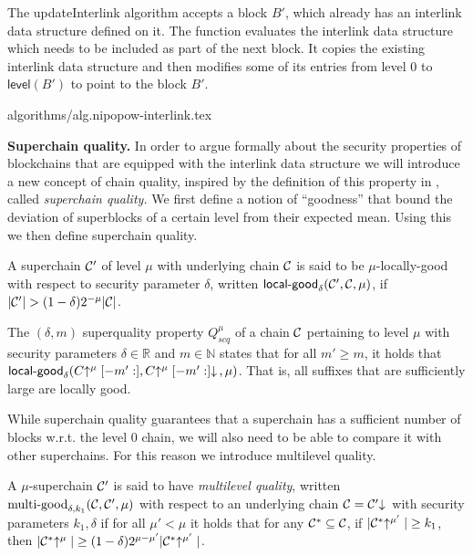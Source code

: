 The updateInterlink algorithm accepts a block $B'$, which already has an
interlink data structure defined on it. The function evaluates the
interlink data structure which needs to be included as part of the next block.
It copies the existing interlink data structure and
then modifies some of its entries from level $0$ to $\textsf{level}(B')$ to
point to the block $B'$.

{algorithms/alg.nipopow-interlink.tex}

\noindent
{\bf Superchain quality.} In order to argue formally about the security
properties of blockchains that are equipped with the interlink
data structure we will introduce a new concept of chain quality,
inspired by the definition of this property in \cite{backbone},
called {\em superchain quality.}
We first define a notion of ``goodness'' that bound the deviation
of superblocks of a certain level from their expected mean. Using
this we then define superchain quality.

\begin{definition}
A superchain $\mathcal{C}'$ of level
$\mu$ with underlying chain $\mathcal{C}$ is said to be $\mu$-\textnormal{locally-good}
with respect to security parameter $\delta$, written
$\textsf{local-good}_{\delta}(\mathcal{C}', \mathcal{C}, \mu)$, if $|\mathcal{C}'| > (1 -
\delta)2^{-\mu}|\mathcal{C}|$.
\end{definition}

\begin{definition}
The $(\delta, m)$ superquality property
$Q^\mu_{scq}$ of a chain $\mathcal{C}$ pertaining to level $\mu$ with security
parameters $\delta \in \mathbb{R}$ and $m \in \mathbb{N}$ states that for all
$m' \geq m$, it holds that $\textsf{local-good}_{\delta}(C\negthickspace\uparrow^\mu[-m':],
C\negthickspace\uparrow^\mu[-m':]\negthickspace\downarrow\,, \mu)$. That is, all suffixes that are
sufficiently large are locally good.
\end{definition}

While superchain quality guarantees that a superchain has a sufficient number
of blocks w.r.t. the level 0 chain, we will also need to be able to compare 
it with other superchains. For this reason we introduce multilevel quality. 

\begin{definition}
A $\mu$-superchain $\mathcal{C}'$ is said to have \textit{multilevel quality}, written
$\textnormal{multi-good}_{\delta, k_1}(\mathcal{C}, \mathcal{C}', \mu)$ with respect to an
underlying chain $\mathcal{C} = \mathcal{C}'\negthickspace\downarrow\,$ with security parameters $k_1,
\delta$ if for all $\mu' < \mu$ it holds that for any $\mathcal{C}^* \subseteq \mathcal{C}$,
if $|\mathcal{C}^*\negthickspace\uparrow^{\mu'}| \geq k_1$, then $|\mathcal{C}^*\negthickspace\uparrow^{\mu}| \geq (1 -
\delta)2^{\mu - \mu'}|\mathcal{C}^*\negthickspace\uparrow^{\mu'}|$.
\end{definition}

